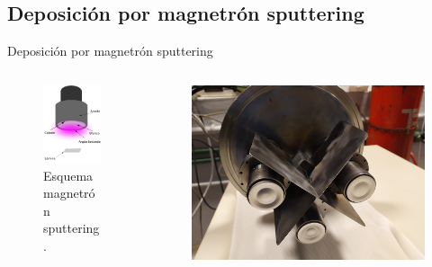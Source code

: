 \documentclass[11pt]{beamer}
\begin{document}
	\subsection{Deposición por magnetrón sputtering}
		\begin{frame}{Deposición por magnetrón sputtering}
			\begin{columns}[T]
				\begin{column}{.4\textwidth}
					\begin{figure}[H]
					\centering
					\includegraphics[scale=0.2]{img/SchemaDeposition.png}
					\caption*{Esquema magnetrón sputtering.}
					\end{figure}
				\end{column}
				\begin{column}{.58\textwidth}
					\begin{figure}[H]
					\includegraphics[scale=0.04]{img/magnetrones.jpg}

\end{figure}
\end{column}
\end{columns}
\end{frame}
\end{document}

